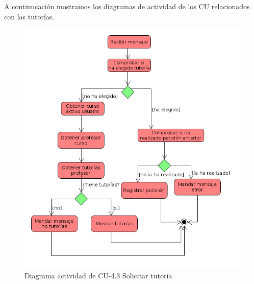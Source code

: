 A continucación mostramos los diagramas de actividad de los CU relacionados con las tutorías.

        \begin{figure}[!ht] %
\centering
\includegraphics[scale=0.5]{imagenes/diagramas/actividad/realizar_peticon_tutoriaa.png}  %

\caption{Diagrama actividad de CU-4.3 Solicitar tutoría}\label{figura143}
\end{figure}

